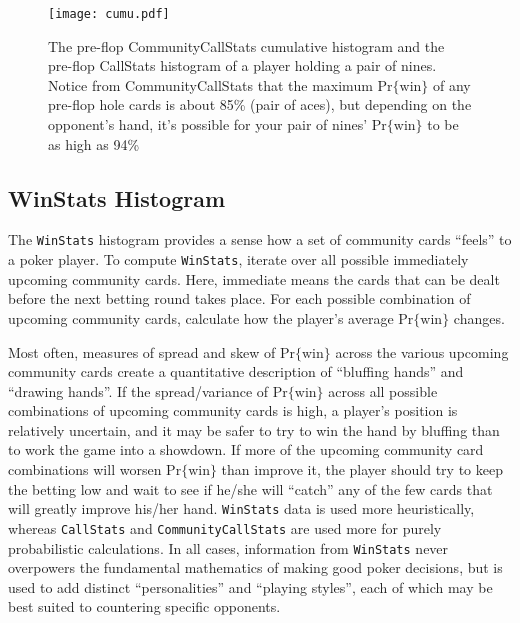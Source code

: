 \begin{figure}[htb]
 \begin{center}
      \texttt{[image: cumu.pdf]} 
 \end{center}
 \caption[Sample Cumulative Histograms]{The pre-flop CommunityCallStats cumulative histogram and the pre-flop CallStats histogram of a player holding a pair of nines. Notice from CommunityCallStats that the maximum $\mathrm{Pr\{win\}}$ of any pre-flop hole cards is about 85\% (pair of aces), but depending on the opponent's hand, it's possible for your pair of nines' $\mathrm{Pr\{win\}}$ to be as high as 94\% }
 \label{fig:Cumu}
\end{figure}





\subsection{WinStats Histogram}
\label{sec:WinStats}

The \texttt{WinStats} histogram provides a sense how a set of community cards ``feels'' to a poker player.
To compute \texttt{WinStats}, iterate over all possible immediately upcoming community cards.
Here, immediate means the cards that can be dealt before the next betting round takes place.
For each possible combination of upcoming community cards, calculate how the player's average $\mathrm{Pr\{win\}}$ changes.

Most often, measures of spread and skew of $\mathrm{Pr\{win\}}$ across the various upcoming community cards create a quantitative description of ``bluffing hands'' and ``drawing hands''.
If the spread/variance of $\mathrm{Pr\{win\}}$ across all possible combinations of upcoming community cards is high, a player's position is relatively uncertain, and it may be safer to try to win the hand by bluffing than to work the game into a showdown.
If more of the upcoming community card combinations will worsen $\mathrm{Pr\{win\}}$ than improve it, the player should try to keep the betting low and wait to see if he/she will ``catch'' any of the few cards that will greatly improve his/her hand.
\texttt{WinStats} data is used more heuristically, whereas \texttt{CallStats} and \texttt{CommunityCallStats} are used more for purely probabilistic calculations.
In all cases, information from \texttt{WinStats} never overpowers the fundamental mathematics of making good poker decisions, but is used to add distinct ``personalities'' and ``playing styles'', each of which may be best suited to countering specific opponents.


